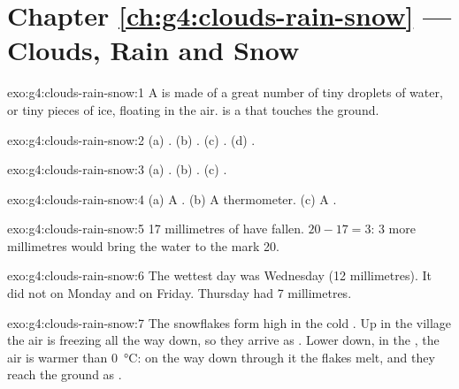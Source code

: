 \section*{Chapter \ref{ch:g4:clouds-rain-snow} --- Clouds, Rain and Snow}

\begin{solution}{exo:g4:clouds-rain-snow:1}
A  is made of a great number of tiny droplets of water, or tiny pieces
of ice, floating in the air.  is a  that touches the ground.
\end{solution}

\begin{solution}{exo:g4:clouds-rain-snow:2}
(a) . (b) . (c) . (d) .
\end{solution}

\begin{solution}{exo:g4:clouds-rain-snow:3}
(a) . (b) . (c) .
\end{solution}

\begin{solution}{exo:g4:clouds-rain-snow:4}
(a) A . (b) A thermometer. (c) A .
\end{solution}

\begin{solution}{exo:g4:clouds-rain-snow:5}
17 millimetres of  have fallen. $20 - 17 = 3$: 3 more millimetres
would bring the water to the mark 20.
\end{solution}

\begin{solution}{exo:g4:clouds-rain-snow:6}
The wettest day was Wednesday (12 millimetres). It did not  on Monday
and on Friday. Thursday had 7 millimetres.
\end{solution}

\begin{solution}{exo:g4:clouds-rain-snow:7}
The snowflakes form high in the cold . Up in the  village the
air is freezing all the way down, so they arrive as . Lower down, in
the , the air is warmer than \SI{0}{\celsius}: on the way down
through it the flakes melt, and they reach the ground as .
\end{solution}

